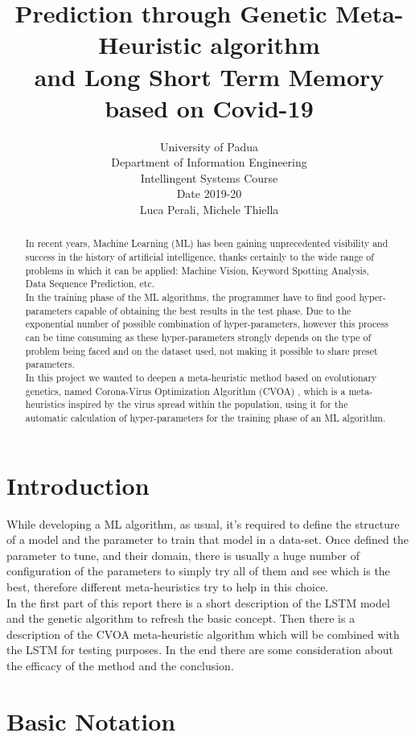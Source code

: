 \documentclass[letterpaper]{article}%
\title{Prediction through Genetic Meta-Heuristic algorithm \\ and Long Short Term Memory based on Covid-19}
\author{ University of Padua \\ Department of Information Engineering \\ Intellingent Systems Course \\ Date 2019-20 \\ %
Luca Perali, Michele Thiella
}
\begin{document}
\maketitle

\begin{abstract}
	In recent years, Machine Learning (ML) has been gaining unprecedented visibility and success in the history of artificial intelligence, thanks certainly to the wide range of problems in which it can be applied: Machine Vision, Keyword Spotting Analysis, Data Sequence Prediction, etc. \\
	In the training phase of the ML algorithms, the programmer have to find good hyper-parameters capable of obtaining the best results in the test phase. Due to the exponential number of possible combination of hyper-parameters, however this process can be time consuming as these hyper-parameters strongly depends on the type of problem being faced and on the dataset used, not making it possible to share preset parameters. \\
	In this project we wanted to deepen a meta-heuristic method based on evolutionary genetics, named Corona-Virus Optimization Algorithm (CVOA) \cite{martnezlvarez2020coronavirus}, which is a meta-heuristics inspired by the virus spread within the population, using it for the automatic calculation of hyper-parameters for the training phase of an ML algorithm.
\end{abstract}

\section{Introduction}
	While developing a ML algorithm, as usual, it's required to define the structure of a model and the parameter to train that model in a data-set. Once defined the parameter to tune, and their domain, there is usually a huge number of configuration of the parameters to simply try all of them and see which is the best, therefore different meta-heuristics try to help in this choice.\\
	In the first part of this report there is a short description of the LSTM model and the genetic algorithm to refresh the basic concept. Then there is a description of the CVOA meta-heuristic algorithm which will be combined with the LSTM for testing purposes. In the end there are some consideration about the efficacy of the method and the conclusion.

\section{Basic Notation}
\end{document}
